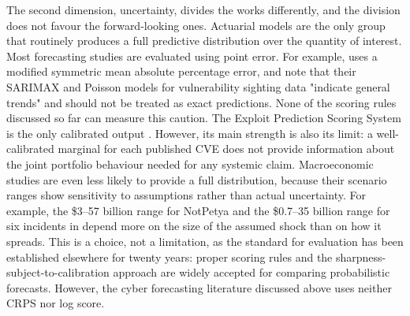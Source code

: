 \documentclass[review]{elsarticle}
\begin{document}
The second dimension, uncertainty, divides the works differently, and the division does not favour the forward-looking ones. Actuarial models are the only group that routinely produces a full predictive distribution over the quantity of interest. Most forecasting studies are evaluated using point error. For example, \citet{almahmoud2023} uses a modified symmetric mean absolute percentage error, and \citet{bonhomme2026} note that their SARIMAX and Poisson models for vulnerability sighting data "indicate general trends" and should not be treated as exact predictions. None of the scoring rules discussed so far can measure this caution. The Exploit Prediction Scoring System is the only calibrated output \citep{jacobs2021,jacobs2023}. However, its main strength is also its limit: a well-calibrated marginal for each published CVE does not provide information about the joint portfolio behaviour needed for any systemic claim. Macroeconomic studies are even less likely to provide a full distribution, because their scenario ranges show sensitivity to assumptions rather than actual uncertainty. For example, the \$3–57 billion range for NotPetya \citep{welburn2022} and the \$0.7–35 billion range for six incidents in \citet{eling2023} depend more on the size of the assumed shock than on how it spreads. This is a choice, not a limitation, as the standard for evaluation has been established elsewhere for twenty years: proper scoring rules \citep{gneiting2007jasa} and the sharpness-subject-to-calibration approach \citep{gneiting2007calibration} are widely accepted for comparing probabilistic forecasts. However, the cyber forecasting literature discussed above uses neither CRPS nor log score.
\end{document}
